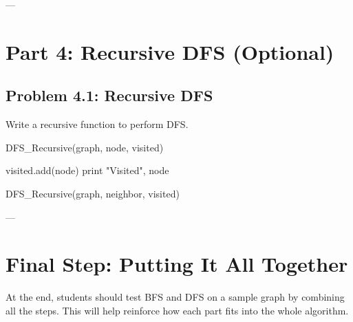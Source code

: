 \documentclass{article}
\begin{document}
---

\section*{Part 4: Recursive DFS (Optional)}

\subsection*{Problem 4.1: Recursive DFS}

Write a recursive function to perform DFS.

\begin{algorithm}[H]
\caption{DFS\_Recursive(graph, node, visited)}
\begin{algorithmic}
    \STATE visited.add(node)
    \STATE print "Visited", node

            \STATE DFS\_Recursive(graph, neighbor, visited)
        \ENDIF
    \ENDFOR
\end{algorithmic}
\end{algorithm}

---

\section*{Final Step: Putting It All Together}

At the end, students should test BFS and DFS on a sample graph by combining all the steps. This will help reinforce how each part fits into the whole algorithm.
\end{document}
